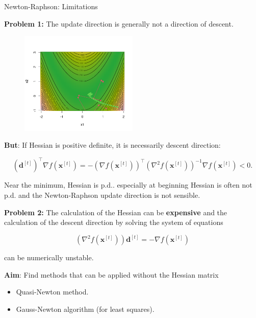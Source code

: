 \documentclass[11pt,compress,t,notes=noshow, xcolor=table]{beamer}
\begin{document}
\begin{vbframe}{Newton-Raphson: Limitations}

\textbf{Problem 1:} The update direction is generally not a direction of descent.

\vspace*{-0.3cm}
\begin{figure}
    \centering
    \includegraphics[width=0.5\textwidth]{slides/05-multivariate-second-order/figure_man/NR_2.png}
\end{figure}

\begin{footnotesize}
\textbf{But}: If Hessian is positive definite, it is necessarily descent direction:

$$
(\mathbf{d}^{[t]})^\top \nabla f(\mathbf{x}^{[t]}) = - \left(\nabla f(\mathbf{x}^{[t]})\right)^\top \left(\nabla^2 f(\mathbf{x}^{[t]})\right)^{-1} \nabla f(\mathbf{x}^{[t]}) <0.
$$

Near the minimum, Hessian is p.d.. especially at beginning Hessian is often not p.d. and the Newton-Raphson update direction is not sensible.
\end{footnotesize}

\framebreak

\textbf{Problem 2:} The calculation of the Hessian can be \textbf{expensive} and the calculation of the descent direction by solving the system of equations

$$
\left(\nabla^2 f(\mathbf{x}^{[t]})\right)\mathbf{d}^{[t]} = - \nabla f(\mathbf{x}^{[t]})
$$

can be numerically unstable.

\lz

\textbf{Aim}: Find methods that can be applied without the Hessian matrix
\begin{itemize}
\item Quasi-Newton method.
\item Gauss-Newton algorithm (for least squares).
\end{itemize}



\end{vbframe}
\end{document}
